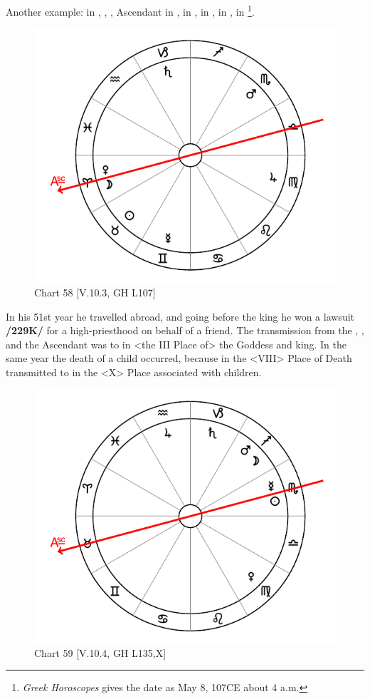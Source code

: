 Another example: \Sun\xspace in \Taurus, \Moon, \Venus, Ascendant in \Aries, \Saturn\xspace in \Capricorn, \Jupiter\xspace in \Virgo, \Mars\xspace in \Scorpio, \Mercury\xspace in \Gemini\footnote{\textit{Greek Horoscopes} gives the date as May 8, 107CE about 4 a.m.}. 

\begin{figure}
\centering
\vspace{-20pt}
\includegraphics[width=.68\textwidth]{charts/5_10_03}
\caption{Chart 58 [V.10.3, GH L107]}
\label{fig:chart58}
\end{figure}


In his 51st year he travelled abroad, and going before the king he won a lawsuit \textbf{/229K/} for a high-priesthood on behalf of a friend. The transmission from the \Moon, \Venus, and the Ascendant was to \Mercury\xspace in <the III Place of> the Goddess and king. In the same year the death of a child occurred, because \Mars\xspace in the <VIII> Place of Death transmitted to \Saturn\xspace in the <X> Place associated with children.

\begin{figure}
\centering
\vspace{-40pt}
\includegraphics[width=.68\textwidth]{charts/5_10_04}
\caption{Chart 59 [V.10.4, GH L135,X]}
\label{fig:chart59}
\end{figure}


